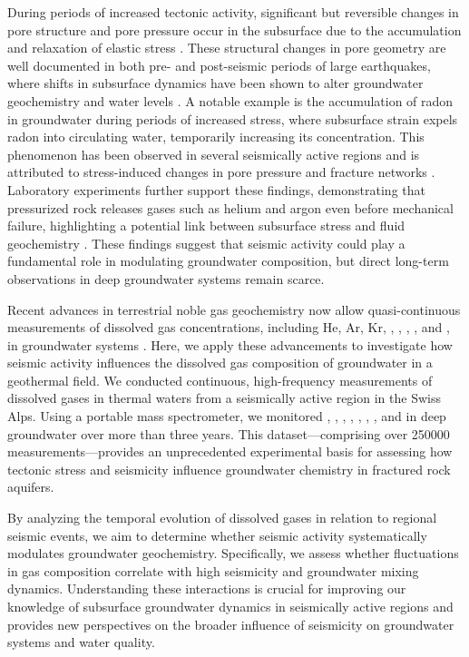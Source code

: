 During periods of increased tectonic activity, significant but reversible changes in pore structure and pore pressure occur in the subsurface due to the accumulation and relaxation of elastic stress \citep{nakagomi2021stress, liu2024opposite}.
These structural changes in pore geometry are well documented in both pre- and post-seismic periods of large earthquakes, where shifts in subsurface dynamics have been shown to alter groundwater geochemistry and water levels \citep{won2019response, rutter2016aquifer}.
A notable example is the accumulation of radon in groundwater during periods of increased stress, where subsurface strain expels radon into circulating water, temporarily increasing its concentration.
This phenomenon has been observed in several seismically active regions and is attributed to stress-induced changes in pore pressure and fracture networks \citep{tarakci2014investigation, dincecco2021co2, igarashi1995radon}.
Laboratory experiments further support these findings, demonstrating that pressurized rock releases gases such as helium and argon even before mechanical failure, highlighting a potential link between subsurface stress and fluid geochemistry \citep{honda1982release, bauer2016release, bauer2019release, roques2020helium}.
These findings suggest that seismic activity could play a fundamental role in modulating groundwater composition, but direct long-term observations in deep groundwater systems remain scarce.

Recent advances in terrestrial noble gas geochemistry now allow quasi-continuous measurements of dissolved gas concentrations, including He, Ar, Kr, , , , , and , in groundwater systems \citep{brennwald2016portable, giroud2023new}.
Here, we apply these advancements to investigate how seismic activity influences the dissolved gas composition of groundwater in a geothermal field.
We conducted continuous, high-frequency measurements of dissolved gases in thermal waters from a seismically active region in the Swiss Alps.
Using a portable mass spectrometer, we monitored , , , , , , , and  in deep groundwater over more than three years.
This dataset---comprising over \num{250000} measurements---provides an unprecedented experimental basis for assessing how tectonic stress and seismicity influence groundwater chemistry in fractured rock aquifers.

By analyzing the temporal evolution of dissolved gases in relation to regional seismic events, we aim to determine whether seismic activity systematically modulates groundwater geochemistry.
Specifically, we assess whether fluctuations in gas composition correlate with high seismicity and groundwater mixing dynamics.
Understanding these interactions is crucial for improving our knowledge of subsurface groundwater dynamics in seismically active regions and provides new perspectives on the broader influence of seismicity on groundwater systems and water quality.

